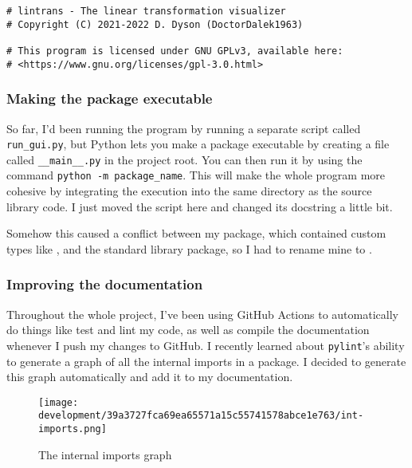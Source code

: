 \documentclass[../development.tex]{subfiles}
\begin{document}
\begin{verbatim}
# lintrans - The linear transformation visualizer
# Copyright (C) 2021-2022 D. Dyson (DoctorDalek1963)

# This program is licensed under GNU GPLv3, available here:
# <https://www.gnu.org/licenses/gpl-3.0.html>
\end{verbatim}

\subsubsection{Making the package executable\label{development:fumbling-with-semver:making-the-package-executable}}

So far, I'd been running the program by running a separate script called \texttt{run\_gui.py}, but Python lets you make a package executable by creating a file called \texttt{\_\_main\_\_.py} in the project root. You can then run it by using the command \texttt{python -m package_name}. This will make the whole program more cohesive by integrating the execution into the same directory as the source library code. I just moved the script here and changed its docstring a little bit.


Somehow this caused a conflict between my  package, which contained custom types like , and the standard library  package, so I had to rename mine to .

\subsubsection{Improving the documentation\label{development:fumbling-with-semver:improving-the-documentation}}

Throughout the whole project, I've been using GitHub Actions\cite{github-actions-docs} to automatically do things like test and lint my code, as well as compile the documentation whenever I push my changes to GitHub. I recently learned about \texttt{pylint}'s ability to generate a graph of all the internal imports in a package\cite{pylint-2.12.2-graph-docs}. I decided to generate this graph automatically and add it to my documentation.


\begin{figure}[H]
	\centering
	\texttt{[image: development/39a3727fca69ea65571a15c55741578abce1e763/int-imports.png]}
	\caption{The internal imports graph}
	\label{fig:development:39a3727fca69ea65571a15c55741578abce1e763:int-imports.png}
\end{figure}
\end{document}
